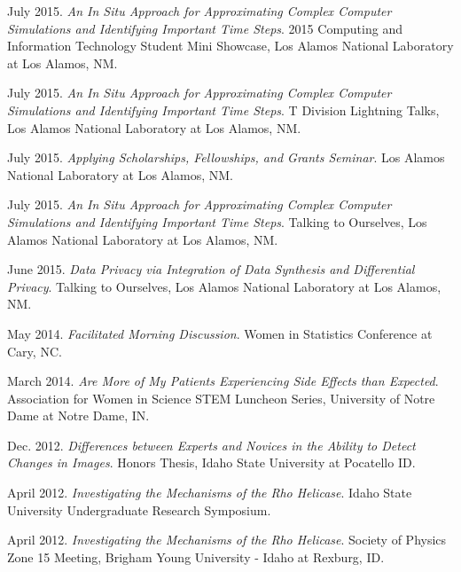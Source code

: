 \documentclass[11pt, letterpaper, roman]{moderncv} %
\begin{document}
\begin{etaremune}[topsep=0pt, itemsep=0.75pt, partopsep=0pt, parsep=0pt]
    \item July 2015. \textit{An In Situ Approach for Approximating Complex Computer Simulations and Identifying Important Time Steps}. 2015 Computing and Information Technology Student Mini Showcase, Los Alamos National Laboratory at Los Alamos, NM.
    
    \item July 2015. \textit{An In Situ Approach for Approximating Complex Computer Simulations and Identifying Important Time Steps}. T Division Lightning Talks, Los Alamos National Laboratory at Los Alamos, NM.
    
    \item July 2015. \textit{Applying Scholarships, Fellowships, and Grants Seminar}. Los Alamos National Laboratory at Los Alamos, NM.
    
    \item July 2015. \textit{An In Situ Approach for Approximating Complex Computer Simulations and Identifying Important Time Steps}. Talking to Ourselves, Los Alamos National Laboratory at Los Alamos, NM.
    
    \item June 2015. \textit{Data Privacy via Integration of Data Synthesis and Differential Privacy}. Talking to Ourselves, Los Alamos National Laboratory at Los Alamos, NM. 
    
    \item May 2014. \textit{Facilitated Morning Discussion}. Women in Statistics Conference at Cary, NC.
    
    \item March 2014. \textit{Are More of My Patients Experiencing Side Effects than Expected}. Association for Women in Science STEM Luncheon Series, University of Notre Dame at Notre Dame, IN.
    
    \item Dec. 2012. \textit{Differences between Experts and Novices in the Ability to Detect Changes in Images}. Honors Thesis, Idaho State University at Pocatello ID.
    
    \item April 2012. \textit{Investigating the Mechanisms of the Rho Helicase}. Idaho State University Undergraduate Research Symposium.
    
    \item April 2012. \textit{Investigating the Mechanisms of the Rho Helicase}. Society of Physics Zone 15 Meeting, Brigham Young University - Idaho at Rexburg, ID.
    

\end{etaremune}
\end{document}
